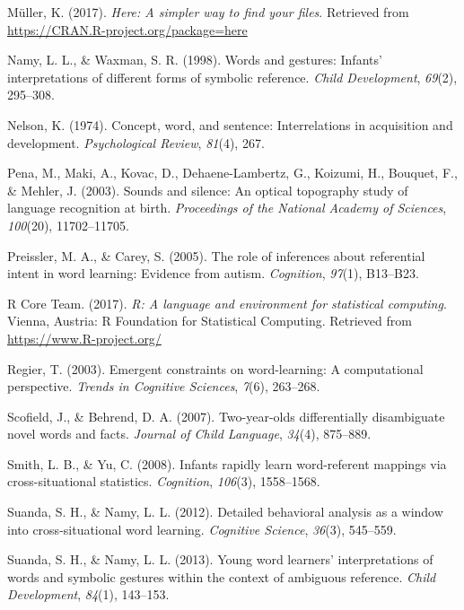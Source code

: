 \documentclass[english,floatsintext,man]{apa6}
\theoremstyle{definition}
\theoremstyle{definition}
\theoremstyle{definition}
\theoremstyle{remark}
\begin{document}
\hypertarget{ref-R-here}{}
Müller, K. (2017). \emph{Here: A simpler way to find your files}.
Retrieved from \url{https://CRAN.R-project.org/package=here}

\hypertarget{ref-namy1998words}{}
Namy, L. L., \& Waxman, S. R. (1998). Words and gestures: Infants'
interpretations of different forms of symbolic reference. \emph{Child
Development}, \emph{69}(2), 295--308.

\hypertarget{ref-nelson1974concept}{}
Nelson, K. (1974). Concept, word, and sentence: Interrelations in
acquisition and development. \emph{Psychological Review}, \emph{81}(4),
267.

\hypertarget{ref-pena2003sounds}{}
Pena, M., Maki, A., Kovac, D., Dehaene-Lambertz, G., Koizumi, H.,
Bouquet, F., \& Mehler, J. (2003). Sounds and silence: An optical
topography study of language recognition at birth. \emph{Proceedings of
the National Academy of Sciences}, \emph{100}(20), 11702--11705.

\hypertarget{ref-preissler2005role}{}
Preissler, M. A., \& Carey, S. (2005). The role of inferences about
referential intent in word learning: Evidence from autism.
\emph{Cognition}, \emph{97}(1), B13--B23.

\hypertarget{ref-R-base}{}
R Core Team. (2017). \emph{R: A language and environment for statistical
computing}. Vienna, Austria: R Foundation for Statistical Computing.
Retrieved from \url{https://www.R-project.org/}

\hypertarget{ref-regier2003emergent}{}
Regier, T. (2003). Emergent constraints on word-learning: A
computational perspective. \emph{Trends in Cognitive Sciences},
\emph{7}(6), 263--268.

\hypertarget{ref-scofield2007two}{}
Scofield, J., \& Behrend, D. A. (2007). Two-year-olds differentially
disambiguate novel words and facts. \emph{Journal of Child Language},
\emph{34}(4), 875--889.

\hypertarget{ref-smith2008infants}{}
Smith, L. B., \& Yu, C. (2008). Infants rapidly learn word-referent
mappings via cross-situational statistics. \emph{Cognition},
\emph{106}(3), 1558--1568.

\hypertarget{ref-suanda2012detailed}{}
Suanda, S. H., \& Namy, L. L. (2012). Detailed behavioral analysis as a
window into cross-situational word learning. \emph{Cognitive Science},
\emph{36}(3), 545--559.

\hypertarget{ref-suanda2013young}{}
Suanda, S. H., \& Namy, L. L. (2013). Young word learners'
interpretations of words and symbolic gestures within the context of
ambiguous reference. \emph{Child Development}, \emph{84}(1), 143--153.
\end{document}
